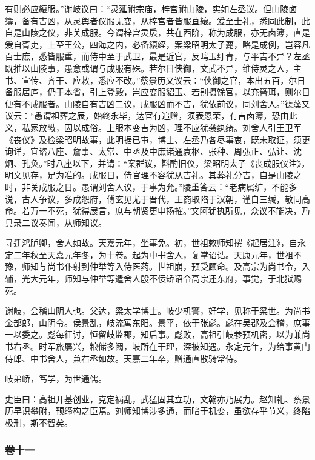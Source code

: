 \documentclass[]{article}
\begin{document}
有则必应縗服。''谢岐议曰：``灵延祔宗庙，梓宫祔山陵，实如左丞议。但山陵卤簿，备有吉凶，从灵舆者仪服无变，从梓宫者皆服苴縗。爰至士礼，悉同此制，此自是山陵之仪，非关成服。今谓梓宫灵扆，共在西阶，称为成服，亦无卤簿，直是爰自胥吏，上至王公，四海之内，必备縗绖，案梁昭明太子薨，略是成例，岂容凡百士庶，悉皆服重，而侍中至于武卫，最是近官，反鸣玉纡青，与平吉不异？左丞既推以山陵事，愚意或谓与成服有殊。若尔日侠御，文武不异，维侍灵之人，主书、宣传、齐干、应敕，悉应不改。''蔡景历又议云：``侠御之官，本出五百，尔日备服居庐，仍于本省，引上登殿，岂应变服貂玉、若别摄馀官，以充簪珥，则尔日便有不成服者。山陵自有吉凶二议，成服凶而不吉，犹依前议，同刘舍人。''德藻又议云：``愚谓祖葬之辰，始终永毕，达官有追赠，须表恩荣，有吉卤簿，恐由此义，私家放斅，因以成俗。上服本变吉为凶，理不应犹袭纨绮。刘舍人引王卫军《丧仪》及检梁昭明故事，此明据已审，博士、左丞乃各尽事衷，既未取证，须更询详，宜谘八座、詹事、太常、中丞及中庶诸通袁枢、张种、周弘正、弘让、沈炯、孔奂。''时八座以下，并请：``案群议，斟酌旧仪，梁昭明太子《丧成服仪注》，明文见存，足为准的。成服日，侍官理不容犹从吉礼。其葬礼分吉，自是山陵之时，非关成服之日。愚谓刘舍人议，于事为允。''陵重答云：``老病属纩，不能多说，古人争议，多成怨府，傅玄见尤于晋代，王商取陷于汉朝，谨自三缄，敬同高命。若万一不死，犹得展言，庶与朝贤更申扬搉。''文阿犹执所见，众议不能决，乃具录二议奏闻，从师知议。

寻迁鸿胪卿，舍人如故。天嘉元年，坐事免。初，世祖敕师知撰《起居注》，自永定二年秋至天嘉元年冬，为十卷。起为中书舍人，复掌诏诰。天康元年，世祖不豫，师知与尚书仆射到仲举等入侍医药。世祖崩，预受顾命。及高宗为尚书令，入辅，光大元年，师知与仲举等遣舍人殷不佞矫诏令高宗还东府，事觉，于北狱赐死。

谢岐，会稽山阴人也。父达，梁太学博士。岐少机警，好学，见称于梁世。为尚书金部郎，山阴令。侯景乱，岐流寓东阳。景平，依于张彪。彪在吴郡及会稽，庶事一以委之。彪每征讨，恒留岐监郡，知后事。彪败，高祖引岐参预机密，以为兼尚书右丞。时军旅屡兴，粮储多阙，岐所在干理，深被知遇。永定元年，为给事黄门侍郎、中书舍人，兼右丞如故。天嘉二年卒，赠通直散骑常侍。

岐弟峤，笃学，为世通儒。

史臣曰：高祖开基创业，克定祸乱，武猛固其立功，文翰亦乃展力。赵知礼、蔡景历早识攀附，预缔构之臣焉。刘师知博涉多通，而暗于机变，虽欲存乎节义，终陷极刑，斯不智矣。

\hypertarget{header-n4537}{%
\subsubsection{卷十一}\label{header-n4537}}
\end{document}
